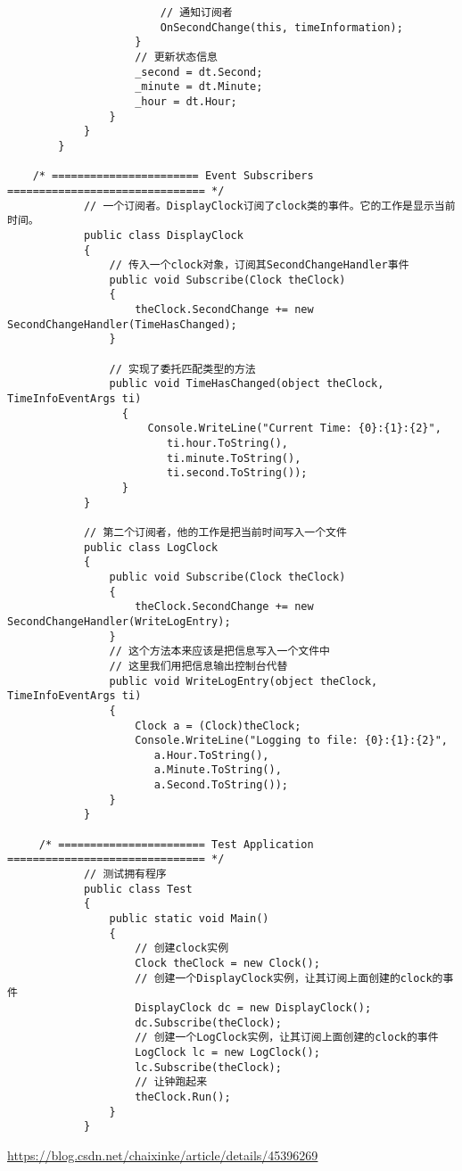 \documentclass[UTF8,a4paper,12pt]{ctexbook}
\begin{document}
\begin{lstlisting}
	                    // 通知订阅者
	                    OnSecondChange(this, timeInformation);
	                }
	                // 更新状态信息
	                _second = dt.Second;
	                _minute = dt.Minute;
	                _hour = dt.Hour;
	            }
	        }
		}
		
	/* ======================= Event Subscribers =============================== */
		    // 一个订阅者。DisplayClock订阅了clock类的事件。它的工作是显示当前时间。
		    public class DisplayClock
		    {
		        // 传入一个clock对象，订阅其SecondChangeHandler事件
		        public void Subscribe(Clock theClock)
		        {
		            theClock.SecondChange += new SecondChangeHandler(TimeHasChanged);
		        }
		        
		        // 实现了委托匹配类型的方法
		        public void TimeHasChanged(object theClock, TimeInfoEventArgs ti)
			      {
			          Console.WriteLine("Current Time: {0}:{1}:{2}",
			             ti.hour.ToString(),
			             ti.minute.ToString(),
			             ti.second.ToString());
			      }
		    }
		    
		    // 第二个订阅者，他的工作是把当前时间写入一个文件
		    public class LogClock
		    {
		        public void Subscribe(Clock theClock)
		        {
		            theClock.SecondChange += new SecondChangeHandler(WriteLogEntry);
		        }
		        // 这个方法本来应该是把信息写入一个文件中
		        // 这里我们用把信息输出控制台代替
		        public void WriteLogEntry(object theClock, TimeInfoEventArgs ti)
		        {
		            Clock a = (Clock)theClock;
		            Console.WriteLine("Logging to file: {0}:{1}:{2}",
		               a.Hour.ToString(),
		               a.Minute.ToString(),
		               a.Second.ToString());
		        }
		    }
		    
 	 /* ======================= Test Application =============================== */
		    // 测试拥有程序
		    public class Test
		    {
		        public static void Main()
		        {
		            // 创建clock实例
		            Clock theClock = new Clock();
		            // 创建一个DisplayClock实例，让其订阅上面创建的clock的事件
		            DisplayClock dc = new DisplayClock();
		            dc.Subscribe(theClock);
		            // 创建一个LogClock实例，让其订阅上面创建的clock的事件
		            LogClock lc = new LogClock();
		            lc.Subscribe(theClock);
		            // 让钟跑起来
		            theClock.Run();
		        }
		    }
				\end{lstlisting}
			
		\url{https://blog.csdn.net/chaixinke/article/details/45396269}
		
		
\end{document}

